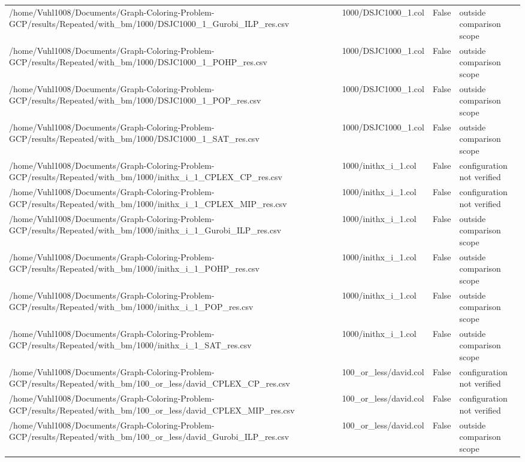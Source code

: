\begin{table}[htbp]
\begin{tabular}{llll}
/home/Vuhl1008/Documents/Graph-Coloring-Problem-GCP/results/Repeated/with\_bm/1000/DSJC1000\_1\_Gurobi\_ILP\_res.csv & 1000/DSJC1000\_1.col & False & outside comparison scope \\
/home/Vuhl1008/Documents/Graph-Coloring-Problem-GCP/results/Repeated/with\_bm/1000/DSJC1000\_1\_POHP\_res.csv & 1000/DSJC1000\_1.col & False & outside comparison scope \\
/home/Vuhl1008/Documents/Graph-Coloring-Problem-GCP/results/Repeated/with\_bm/1000/DSJC1000\_1\_POP\_res.csv & 1000/DSJC1000\_1.col & False & outside comparison scope \\
/home/Vuhl1008/Documents/Graph-Coloring-Problem-GCP/results/Repeated/with\_bm/1000/DSJC1000\_1\_SAT\_res.csv & 1000/DSJC1000\_1.col & False & outside comparison scope \\
/home/Vuhl1008/Documents/Graph-Coloring-Problem-GCP/results/Repeated/with\_bm/1000/inithx\_i\_1\_CPLEX\_CP\_res.csv & 1000/inithx\_i\_1.col & False & configuration not verified \\
/home/Vuhl1008/Documents/Graph-Coloring-Problem-GCP/results/Repeated/with\_bm/1000/inithx\_i\_1\_CPLEX\_MIP\_res.csv & 1000/inithx\_i\_1.col & False & configuration not verified \\
/home/Vuhl1008/Documents/Graph-Coloring-Problem-GCP/results/Repeated/with\_bm/1000/inithx\_i\_1\_Gurobi\_ILP\_res.csv & 1000/inithx\_i\_1.col & False & outside comparison scope \\
/home/Vuhl1008/Documents/Graph-Coloring-Problem-GCP/results/Repeated/with\_bm/1000/inithx\_i\_1\_POHP\_res.csv & 1000/inithx\_i\_1.col & False & outside comparison scope \\
/home/Vuhl1008/Documents/Graph-Coloring-Problem-GCP/results/Repeated/with\_bm/1000/inithx\_i\_1\_POP\_res.csv & 1000/inithx\_i\_1.col & False & outside comparison scope \\
/home/Vuhl1008/Documents/Graph-Coloring-Problem-GCP/results/Repeated/with\_bm/1000/inithx\_i\_1\_SAT\_res.csv & 1000/inithx\_i\_1.col & False & outside comparison scope \\
/home/Vuhl1008/Documents/Graph-Coloring-Problem-GCP/results/Repeated/with\_bm/100\_or\_less/david\_CPLEX\_CP\_res.csv & 100\_or\_less/david.col & False & configuration not verified \\
/home/Vuhl1008/Documents/Graph-Coloring-Problem-GCP/results/Repeated/with\_bm/100\_or\_less/david\_CPLEX\_MIP\_res.csv & 100\_or\_less/david.col & False & configuration not verified \\
/home/Vuhl1008/Documents/Graph-Coloring-Problem-GCP/results/Repeated/with\_bm/100\_or\_less/david\_Gurobi\_ILP\_res.csv & 100\_or\_less/david.col & False & outside comparison scope \\

\end{tabular}
\end{table}
